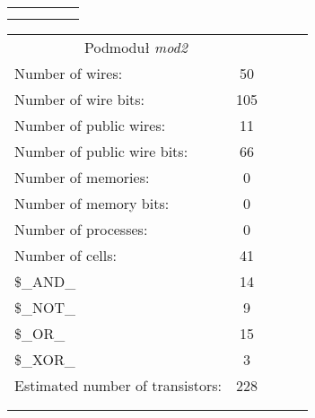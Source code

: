 \begin{table}[!htb]
\begin{minipage}{0.55\linewidth}
\begin{tabular}{lllll}
			&  &  &  &  \\
			&  &  &  & 
		\end{tabular}
	\end{minipage}%
	\begin{minipage}{0.55\linewidth}
		\centering
		\begin{tabular}{lllll}
			\cline{1-2}
			\multicolumn{2}{|c|}{Podmoduł \emph{mod2}} &  &  &  \\ \cline{1-2}
			\multicolumn{1}{|l|}{Number of wires:} & \multicolumn{1}{c|}{50} &  &  &  \\ \cline{1-2}
			\multicolumn{1}{|l|}{Number of wire bits:} & \multicolumn{1}{c|}{105} &  &  &  \\ \cline{1-2}
			\multicolumn{1}{|l|}{Number of public wires:} & \multicolumn{1}{c|}{11} &  &  &  \\ \cline{1-2}
			\multicolumn{1}{|l|}{Number of public wire bits:} & \multicolumn{1}{c|}{66} &  &  &  \\ \cline{1-2}
			\multicolumn{1}{|l|}{Number of memories:} & \multicolumn{1}{c|}{0} &  &  &  \\ \cline{1-2}
			\multicolumn{1}{|l|}{Number of memory bits: } & \multicolumn{1}{c|}{0} &  &  &  \\ \cline{1-2}
			\multicolumn{1}{|l|}{Number of processes: } & \multicolumn{1}{c|}{0} &  &  &  \\ \cline{1-2}
			\multicolumn{1}{|l|}{Number of cells:} & \multicolumn{1}{c|}{41} &  &  &  \\ \cline{1-2}
			\multicolumn{1}{|l|}{\$\_AND\_} & \multicolumn{1}{c|}{14} &  &  &  \\ \cline{1-2}
			\multicolumn{1}{|l|}{\$\_NOT\_} & \multicolumn{1}{c|}{9} &  &  &  \\ \cline{1-2}
			\multicolumn{1}{|l|}{\$\_OR\_} & \multicolumn{1}{c|}{15} &  &  &  \\ \cline{1-2}
			\multicolumn{1}{|l|}{\$\_XOR\_} & \multicolumn{1}{c|}{3} &  &  &  \\ \cline{1-2}
			\multicolumn{1}{|l|}{Estimated number of transistors:} & \multicolumn{1}{c|}{228} &  &  &  \\ \cline{1-2}
			
			&  &  &  &  \\
			&  &  &  & 
		\end{tabular}
	\end{minipage} 
\end{table}

\newpage

